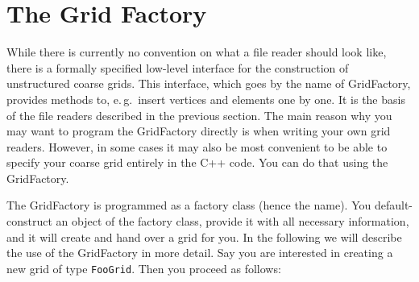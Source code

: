 \documentclass[11pt,a4paper,headinclude,footinclude,DIV16,headings=normal]{scrreprt}
\begin{document}
\section{The Grid Factory}
\label{sec:grid_factory}

While there is currently no convention on what a file reader should look like,
there is a formally specified low-level interface for the construction of
unstructured coarse grids.  This interface, which goes by the name of
GridFactory, provides methods to, e.\,g.~insert vertices and elements one by one.
It is the basis of the file readers described in the previous section.
The main reason why you may want to program the GridFactory directly is
when writing your own grid readers.  However, in some cases it may also be
most convenient to be able to specify your coarse grid entirely in the
C++ code.  You can do that using the GridFactory.

The GridFactory is programmed as a factory class (hence the name).
You default-construct an object of the factory class, provide it with all
necessary information, and it will create and hand over a grid for you.
In the following we will describe the use of the GridFactory in more detail.
Say you are interested in creating a new grid of type \lstinline!FooGrid!.  Then
you proceed as follows:
\end{document}
